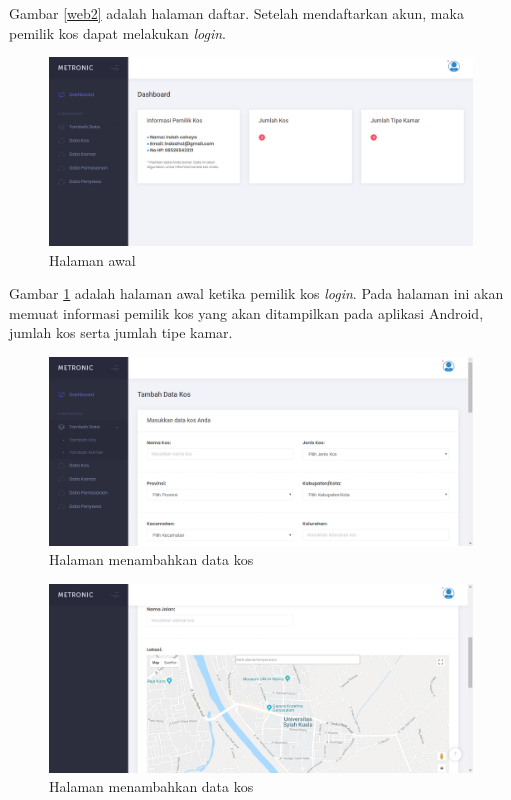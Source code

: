 \begin{enumerate}[a.]
		Gambar \ref{web2} adalah halaman daftar. Setelah mendaftarkan akun, maka pemilik kos dapat melakukan \textit{login}.
		
		\begin{figure}[H]
			\centering
			\includegraphics[width=\textwidth]{gambar/web/3}
			\caption{Halaman awal}
			\label{web3}
		\end{figure}
		
		Gambar \ref{web3} adalah halaman awal ketika pemilik kos \textit{login}. Pada halaman ini akan memuat informasi pemilik kos yang akan ditampilkan pada aplikasi Android, jumlah kos serta jumlah tipe kamar. 
		
		\begin{figure}[H]
			\centering
			\includegraphics[width=\textwidth]{gambar/web/4}
			\caption{Halaman menambahkan data kos}
			\label{web4}
		\end{figure}
	
		\begin{figure}[H]
			\centering
			\includegraphics[width=\textwidth]{gambar/web/5}
			\caption{Halaman menambahkan data kos}
			\label{web5}
		\end{figure}
	

\end{enumerate}
